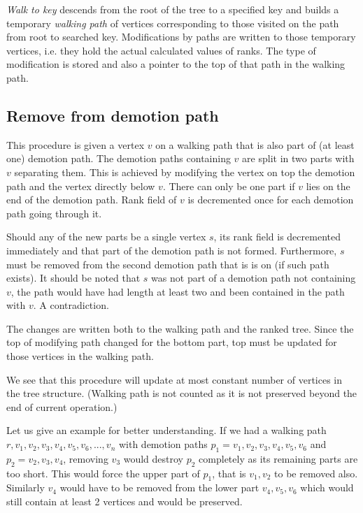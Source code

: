 \emph{Walk to key} descends from the root of the tree to a specified key and builds a temporary {\em walking path} of vertices corresponding to those visited on the path from root to searched key. Modifications by paths are written to those temporary vertices, i.e. they hold the actual calculated values of ranks. The type of modification is stored and also a pointer to the top of that path in the walking path.

\subsection{Remove from demotion path}

This procedure is given a vertex $v$ on a walking path that is also part of (at least one) demotion path. The demotion paths containing $v$ are split in two parts with $v$ separating them. This is achieved by modifying the vertex on top the demotion path and the vertex directly below $v$. There can only be one part if $v$ lies on the end of the demotion path. Rank field of $v$ is decremented once for each demotion path going through it. 

Should any of the new parts be a single vertex $s$, its rank field is decremented immediately and that part of the demotion path is not formed. Furthermore, $s$ must be removed from the second demotion path that is is on (if such path exists). It should be noted that $s$ was not part of a demotion path not containing $v$, the path would have had length at least two and been contained in the path with $v$. A contradiction. 

The changes are written both to the walking path and the ranked tree. Since the top of modifying path changed for the bottom part, top must be updated for those vertices in the walking path.

We see that this procedure will update at most constant number of vertices in the tree structure. (Walking path is not counted as it is not preserved beyond the end of current operation.)

Let us give an example for better understanding. If we had a walking path $r,v_1,v_2,v_3,v_4,v_5,v_6,...,v_n$ with demotion paths $p_1 = v_1,v_2,v_3,v_4,v_5,v_6$ and $p_2 = v_2,v_3,v_4$, removing $v_3$ would destroy $p_2$ completely as its remaining parts are too short. This would force the upper part of $p_1$, that is $v_1,v_2$ to be removed also. Similarly $v_4$ would have to be removed from the lower part $v_4,v_5,v_6$ which would still contain at least 2 vertices and would be preserved.

